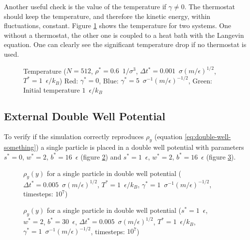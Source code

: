\documentclass[a4paper]{article}
\begin{document}
Another useful check is the value of the temperature if $\gamma \neq 0$. The thermostat should keep the temperature, and therefore the kinetic energy, within fluctuations, constant. Figure \ref{im:temperature} shows the temperature for two systems. One without a thermostat, the other one is coupled to a heat bath with the Langevin equation. One can clearly see the significant temperature drop if no thermostat is used.

\begin{figure} [H]
\centering
\scalebox{1.1}{}
\caption{Temperature ($N = 512$, $\rho^* = 0.6 \enspace 1/\sigma^3$, $\Delta t^* = 0.001 \enspace \sigma (m/\epsilon)^{1/2}$, $T^* = 1 \enspace \epsilon/k_B$) Red: $\gamma^* = 0$, Blue: $\gamma^* = 5 \enspace \sigma^{-1} (m/\epsilon)^{-1/2}$, Green: Initial temperature $1 \enspace \epsilon/k_B$}
\label{im:temperature}
\end{figure}

\subsection{External Double Well Potential}

To verify if the simulation correctly reproduces $\rho_y$ (equation \ref{eq:double-well-something}) a single particle is placed in a double well potential with parameters $s^* = 0$, $w^* = 2$, $b^* = 16 \enspace \epsilon$ (figure \ref{im:distribution_double_well}) and $s^* = 1 \enspace \epsilon$, $w^* = 2$, $b^* = 16 \enspace \epsilon$ (figure \ref{im:distribution_double_well_2}). 

\begin{figure} [H]
\centering
\scalebox{.9}{}
\caption{$\rho_y(y)$ for a single particle in double well potential ($\Delta t^* = 0.005 \enspace \sigma (m/\epsilon)^{1/2}$, $T^* = 1 \enspace \epsilon/k_B$, $\gamma^* = 1 \enspace \sigma^{-1} (m/\epsilon)^{-1/2}$, timesteps: $10^7$)}
\label{im:distribution_double_well}
\end{figure}

\begin{figure} [H]
\centering
\scalebox{.9}{}
\caption{$\rho_y(y)$ for a single particle in double well potential ($s^* = 1 \enspace \epsilon$, $w^* = 2$, $b^* = 30 \enspace \epsilon$, $\Delta t^* = 0.005 \enspace \sigma (m/\epsilon)^{1/2}$, $T^* = 1 \enspace \epsilon/k_B$, $\gamma^* = 1 \enspace \sigma^{-1} (m/\epsilon)^{-1/2}$, timesteps: $10^7$)}
\label{im:distribution_double_well_2}
\end{figure}
\end{document}
